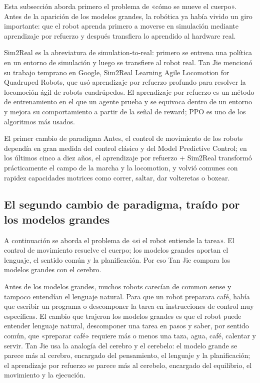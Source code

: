 \documentclass[a4paper]{article}
\begin{document}
Esta subsección aborda primero el problema de «cómo se mueve el cuerpo». Antes de la aparición de los modelos grandes, la robótica ya había vivido un giro importante: que el robot aprenda primero a moverse en simulación mediante aprendizaje por refuerzo y después transfiera lo aprendido al hardware real.

Sim2Real es la abreviatura de simulation-to-real: primero se entrena una política en un entorno de simulación y luego se transfiere al robot real. Tan Jie mencionó su trabajo temprano en Google, Sim2Real Learning Agile Locomotion for Quadruped Robots, que usó aprendizaje por refuerzo profundo para resolver la locomoción ágil de robots cuadrúpedos. El aprendizaje por refuerzo es un método de entrenamiento en el que un agente prueba y se equivoca dentro de un entorno y mejora su comportamiento a partir de la señal de reward; PPO es uno de los algoritmos más usados.

\begin{importantbox}{El primer cambio de paradigma}
Antes, el control de movimiento de los robots dependía en gran medida del control clásico y del Model Predictive Control; en los últimos cinco a diez años, el aprendizaje por refuerzo + Sim2Real transformó prácticamente el campo de la marcha y la locomotion, y volvió comunes con rapidez capacidades motrices como correr, saltar, dar volteretas o boxear.
\end{importantbox}

\subsection{El segundo cambio de paradigma, traído por los modelos grandes}

A continuación se aborda el problema de «si el robot entiende la tarea». El control de movimiento resuelve el cuerpo; los modelos grandes aportan el lenguaje, el sentido común y la planificación. Por eso Tan Jie compara los modelos grandes con el cerebro.

Antes de los modelos grandes, muchos robots carecían de common sense y tampoco entendían el lenguaje natural. Para que un robot preparara café, había que escribir un programa o descomponer la tarea en instrucciones de control muy específicas. El cambio que trajeron los modelos grandes es que el robot puede entender lenguaje natural, descomponer una tarea en pasos y saber, por sentido común, que «preparar café» requiere más o menos una taza, agua, café, calentar y servir. Tan Jie usa la analogía del cerebro y el cerebelo: el modelo grande se parece más al cerebro, encargado del pensamiento, el lenguaje y la planificación; el aprendizaje por refuerzo se parece más al cerebelo, encargado del equilibrio, el movimiento y la ejecución.
\end{document}
